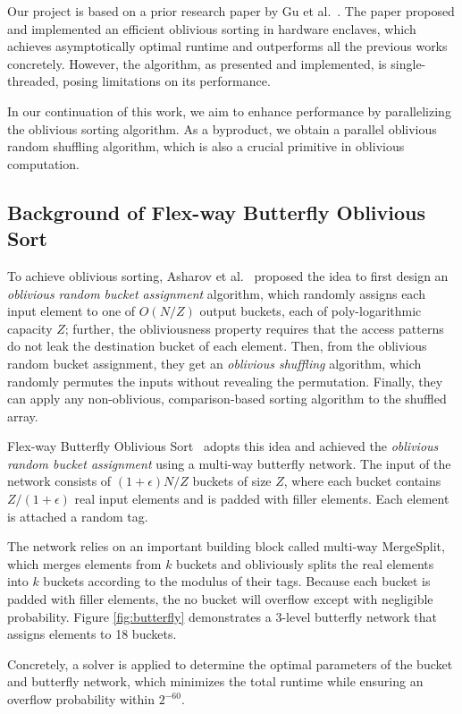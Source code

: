 \documentclass{article}
\begin{document}
Our project is based on a prior research paper by Gu et al.~\cite{osort}. The paper proposed and implemented an efficient oblivious sorting in hardware enclaves, which achieves asymptotically optimal runtime and outperforms all the previous works concretely. However, the algorithm, as presented and implemented, is single-threaded, posing limitations on its performance.

In our continuation of this work, we aim to enhance performance by parallelizing the oblivious sorting algorithm. As a byproduct, we obtain a parallel oblivious random shuffling algorithm, which is also a crucial primitive in oblivious computation.

\subsection{Background of Flex-way Butterfly Oblivious Sort}
To achieve oblivious sorting, Asharov et al.~\cite{bucketsort} proposed the idea to first design an {\it oblivious random bucket assignment}
algorithm, which randomly assigns each
input element to one of $O(N/Z)$ output buckets, each of poly-logarithmic
capacity $Z$; further, the obliviousness property requires that
the access patterns do not leak the destination bucket of each element.
Then, from the oblivious random bucket assignment, they
get an {\it oblivious shuffling} algorithm,
which randomly permutes
the inputs without revealing the permutation. Finally,
they can apply any non-oblivious, comparison-based sorting algorithm to the shuffled array.

Flex-way Butterfly Oblivious Sort~\cite{osort} adopts this idea and achieved the {\it oblivious random bucket assignment} using a multi-way butterfly network. The input of the network consists of $(1+\epsilon)N/Z$ buckets of size $Z$, where each bucket contains $Z/(1+\epsilon)$ real input elements and is padded with filler elements. Each element is attached a random tag.

The network relies on an important building block called multi-way {\sf MergeSplit}, which merges elements from $k$ buckets and obliviously splits the real elements into $k$ buckets according to the modulus of their tags. Because each bucket is padded with filler elements, the no bucket will overflow except with negligible probability. Figure \ref{fig:butterfly} demonstrates a 3-level butterfly network that assigns elements to 18 buckets.

Concretely, a solver is applied to determine the optimal parameters of the bucket and butterfly network, which minimizes the total runtime while ensuring an overflow probability within $2^{-60}$.
\end{document}
